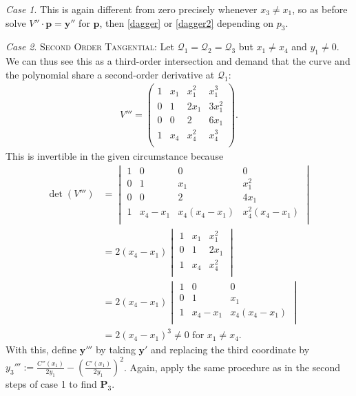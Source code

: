 \documentclass[english,11pt,a4paper]{article}
\theoremstyle{definition}
\theoremstyle{remark}
\theoremstyle{case}
\newtheorem{case}{Case}
\renewcommand{\P}{\mathbf{P}}
\newcommand{\q}{\mathcal{Q}}
\begin{document}
\begin{case}
	This is again different from zero precisely whenever $x_3 \neq x_1$, so as before solve $V'' \cdot \mathbf{p} = \mathbf{y''}$ for $\mathbf{p}$, then \eqref{dagger} or \eqref{dagger2} depending on $p_3$.
\end{case}

\begin{case}
	{\scshape Second Order Tangential:} Let $\q_1=\q_2=\q_3$ but $x_1 \neq x_4$ and $y_1 \neq 0$. We can thus see this as a third-order intersection and demand that the curve and the polynomial share a second-order derivative at $\q_1$:
	\begin{align*}V'''=
			\begin{pmatrix}
			1 & x_1 & x_1^2 & x_1^3\\
			0 & 1 & 2 x_1 & 3 x_1^2\\
			0 & 0 & 2 & 6x_1\\
			1 & x_4 & x_4^2 & x_4^3\\
		\end{pmatrix}.
	\end{align*}	
	This is invertible in the given circumstance because
	\begin{align*}\det (V''') &=
		\begin{vmatrix}
			1 & 0 & 0 & 0\\
			0 & 1 & x_1 & x_1^2\\
			0 & 0 & 2 & 4x_1\\
			1 & x_4-x_1 & x_4(x_4-x_1) & x_4^2(x_4-x_1)\\
		\end{vmatrix}
		\\
		&= 2 (x_4-x_1)
		\begin{vmatrix}
			1 & x_1 & x_1^2\\
			0 & 1 & 2x_1\\
			1 & x_4 & x_4^2\\
		\end{vmatrix}
		\\
		&= 2 (x_4-x_1)
		\begin{vmatrix}
			1 & 0 & 0\\
			0 & 1 & x_1\\
			1 & x_4-x_1 & x_4(x_4-x_1)\\
		\end{vmatrix}
		\\
		&= 2 (x_4-x_1)^3 \neq 0 \text{ for } x_1\neq x_4.
	\end{align*}
	With this, define $\mathbf{y'''}$ by taking $\mathbf{y'}$ and replacing the third coordinate by $y_3''' := \frac{C''(x_1)}{2y_1}-(\frac{C'(x_1)}{2y_1})^2$. Again, apply the same procedure as in the second steps of case 1 to find $\P_3$.
\end{case}
\end{document}
